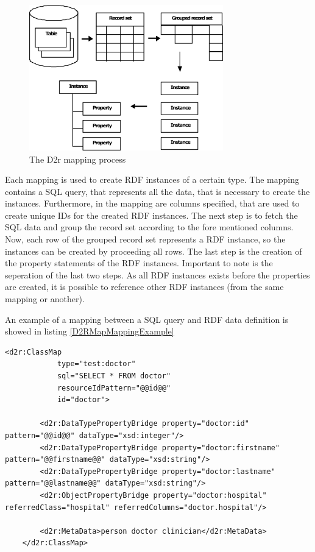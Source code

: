 \begin{figure}[H]
	\begin{center}
		\includegraphics[width=0.75\textwidth]{figures/MappingProcess.png}
	\end{center}
	\caption{The D2r mapping process \cite{D2rMap_aDatabaseToRdfMappingLanguage}}
	\label{D2rMappingProcessFigure}
\end{figure}

Each mapping is used to create RDF instances of a certain type. The mapping contains a SQL query, that represents all the data, that is necessary to create the instances. Furthermore, in the mapping are columns specified, that are used to create unique IDs for the created RDF instances.
The next step is to fetch the SQL data and group the record set according to the fore mentioned columns. Now, each row of the grouped record set represents a RDF instance, so the instances can be created by proceeding all rows. The last step is the creation of the property statements of the RDF instances. Important to note is the seperation of the last two steps. As all RDF instances exists before the properties are created, it is possible to reference other RDF instances (from the same mapping or another).

An example of a mapping between a SQL query and RDF data definition is showed in listing \ref{D2RMapMappingExample}

\begin{lstlisting}[style=RdfCodeStyle, caption=Example of a MeDSpace D2rMap mapping, label=D2RMapMappingExample]
<d2r:ClassMap
			type="test:doctor"
			sql="SELECT * FROM doctor"
			resourceIdPattern="@@id@@"
			id="doctor">

		<d2r:DataTypePropertyBridge property="doctor:id" pattern="@@id@@" dataType="xsd:integer"/>
		<d2r:DataTypePropertyBridge property="doctor:firstname" pattern="@@firstname@@" dataType="xsd:string"/>
		<d2r:DataTypePropertyBridge property="doctor:lastname" pattern="@@lastname@@" dataType="xsd:string"/>
		<d2r:ObjectPropertyBridge property="doctor:hospital" referredClass="hospital" referredColumns="doctor.hospital"/>

		<d2r:MetaData>person doctor clinician</d2r:MetaData>
	</d2r:ClassMap>

\end{lstlisting}

